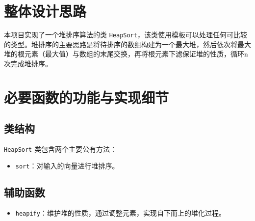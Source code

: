 \documentclass[UTF8]{ctexart}
\begin{document}
\pagestyle{fancy}
\fancyhead{}

\section{整体设计思路}
本项目实现了一个堆排序算法的类 \texttt{HeapSort}，该类使用模板可以处理任何可比较的类型。堆排序的主要思路是将待排序的数组构建为一个最大堆，然后依次将最大堆的根元素（最大值）与数组的末尾交换，再将根元素下滤保证堆的性质，循环n次完成堆排序。

\section{必要函数的功能与实现细节}
\subsection{类结构}
\texttt{HeapSort} 类包含两个主要公有方法：
\begin{itemize}
    \item \texttt{sort}：对输入的向量进行堆排序。
\end{itemize}

\subsection{辅助函数}
\begin{itemize}
    \item \texttt{heapify}：维护堆的性质，通过调整元素，实现自下而上的堆化过程。
\end{itemize}
\end{document}
